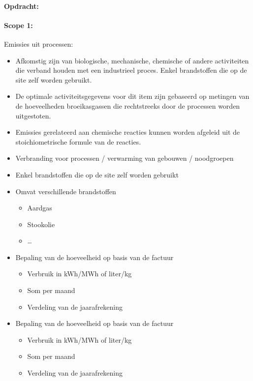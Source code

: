 \documentclass[12pt]{article}
\begin{document}
\paragraph{Opdracht:}
\paragraph{Scope 1:}
Emissies uit processen:\begin{itemize}
    \item Afkomstig zijn van biologische, mechanische, chemische of andere activiteiten die
    verband houden met een industrieel proces. Enkel brandstoffen die op de site zelf
    worden gebruikt.
    \item De optimale activiteitsgegevens voor dit item zijn gebaseerd op metingen van de
    hoeveelheden broeikasgassen die rechtstreeks door de processen worden uitgestoten.
    \item Emissies gerelateerd aan chemische reacties kunnen worden afgeleid uit de
    stoichiometrische formule van de reacties.
    \item Verbranding voor processen / verwarming van gebouwen / noodgroepen
    \item Enkel brandstoffen die op de site zelf worden gebruikt 
    \item Omvat verschillende brandstoffen\begin{itemize}
        \item Aardgas 
        \item Stookolie 
        \item \dots
    \end{itemize}  
    \item Bepaling van de hoeveelheid op basis van de factuur\begin{itemize}
        \item Verbruik in kWh/MWh of liter/kg
        \item Som per maand
        \item Verdeling van de jaarafrekening
    \end{itemize}
    \item Bepaling van de hoeveelheid op basis van de factuur\begin{itemize}
        \item Verbruik in kWh/MWh of liter/kg
        \item Som per maand
        \item Verdeling van de jaarafrekening
    \end{itemize}
\end{itemize}
\end{document}
